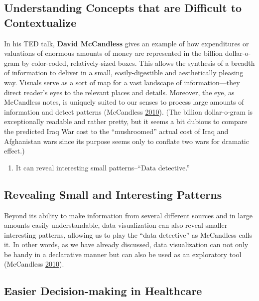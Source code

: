 \documentclass[]{book}
\providecommand{\tightlist}{%
  \setlength{\itemsep}{0pt}\setlength{\parskip}{0pt}}
\theoremstyle{definition}
\theoremstyle{definition}
\theoremstyle{definition}
\theoremstyle{remark}
\begin{document}
\subsection{Understanding Concepts that are Difficult to
Contextualize}\label{understanding-concepts-that-are-difficult-to-contextualize}

In his TED talk, \textbf{David McCandless} gives an example of how
expenditures or valuations of enormous amounts of money are represented
in the billion dollar-o-gram by color-coded, relatively-sized boxes.
This allows the synthesis of a breadth of information to deliver in a
small, easily-digestible and aesthetically pleasing way. Visuals serve
as a sort of map for a vast landscape of information---they direct
reader's eyes to the relevant places and details. Moreover, the eye, as
McCandless notes, is uniquely suited to our senses to process large
amounts of information and detect patterns (McCandless
\protect\hyperlink{ref-viz_ted}{2010}). (The billion dollar-o-gram is
exceptionally readable and rather pretty, but it seems a bit dubious to
compare the predicted Iraq War cost to the ``mushroomed'' actual cost of
Iraq and Afghanistan wars since its purpose seems only to conflate two
wars for dramatic effect.)

\begin{enumerate}
\def\labelenumi{\arabic{enumi}.}
\setcounter{enumi}{2}
\tightlist
\item
  It can reveal interesting small patterns--``Data detective.''
\end{enumerate}

\subsection{Revealing Small and Interesting
Patterns}\label{revealing-small-and-interesting-patterns}

Beyond its ability to make information from several different sources
and in large amounts easily understandable, data visualization can also
reveal smaller interesting patterns, allowing us to play the ``data
detective'' as McCandless calls it. In other words, as we have already
discussed, data visualization can not only be handy in a declarative
manner but can also be used as an exploratory tool (McCandless
\protect\hyperlink{ref-viz_ted}{2010}).

\subsection{Easier Decision-making in
Healthcare}\label{easier-decision-making-in-healthcare}
\end{document}

